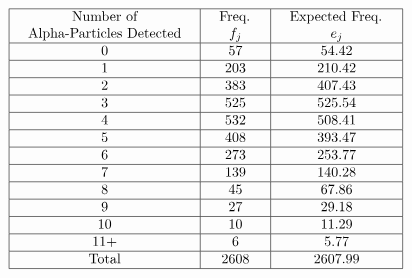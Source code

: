 \[ \begin{array}{|c|c|c|}
        \hline \begin{array}{c}
            \text { Number of } \\
            \text { Alpha-Particles Detected }
        \end{array} & \begin{array}{c}
            \text { Freq. } \\
            f_{j}
        \end{array} & \begin{array}{c}
            \text { Expected Freq. } \\
            e_{j}
        \end{array} \\
        \hline 0                          & 57                         & 54.42                      \\
        \hline 1                          & 203                        & 210.42                     \\
        \hline 2                          & 383                        & 407.43                     \\
        \hline 3                          & 525                        & 525.54                     \\
        \hline 4                          & 532                        & 508.41                     \\
        \hline 5                          & 408                        & 393.47                     \\
        \hline 6                          & 273                        & 253.77                     \\
        \hline 7                          & 139                        & 140.28                     \\
        \hline 8                          & 45                         & 67.86                      \\
        \hline 9                          & 27                         & 29.18                      \\
        \hline 10                         & 10                         & 11.29                      \\
        \hline 11+                        & 6                          & 5.77                       \\
        \hline \text { Total }            & 2608                       & 2607.99                    \\
        \hline
    \end{array} \]


